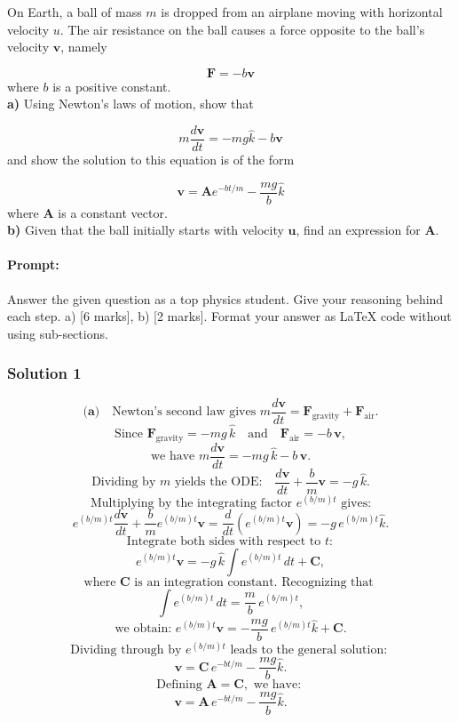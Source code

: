 \documentclass{article}
\begin{document}
On Earth, a ball of mass $m$ is dropped from an airplane moving with horizontal velocity $u$. The air resistance on the ball causes a force opposite to the ball's velocity $\mathbf{v}$, namely

\[
\mathbf{F} = -b \mathbf{v}
\]
where $b$ is a positive constant. \\

\textbf{a)} Using Newton's laws of motion, show that

\[
m \frac{d \mathbf{v}}{dt} = -mg \hat{k} - b \mathbf{v}
\]
and show the solution to this equation is of the form

\[
\mathbf{v} = \mathbf{A} e^{-bt/m} - \frac{mg}{b} \hat{k}
\]
where $\mathbf{A}$ is a constant vector.\\

\textbf{b)} Given that the ball initially starts with velocity $\mathbf{u}$, find an expression for $\mathbf{A}$.

\paragraph{Prompt: \\} 
Answer the given question as a top physics student. Give your reasoning behind each step. a) [6 marks], b) [2 marks].
Format your answer as LaTeX code without using sub-sections.

\subsubsection{Solution 1}
\[
\textbf{(a)}\quad \text{Newton's second law gives } m\frac{d\mathbf{v}}{dt} = \mathbf{F}_{\text{gravity}} + \mathbf{F}_{\text{air}}.
\]
\[
\text{Since } \mathbf{F}_{\text{gravity}} = -mg\,\hat{k} \quad \text{and} \quad \mathbf{F}_{\text{air}} = -b\,\mathbf{v},
\]
\[
\text{we have } m\frac{d\mathbf{v}}{dt} = -mg\,\hat{k} - b\,\mathbf{v}.
\]
\[
\text{Dividing by } m \text{ yields the ODE:} \quad \frac{d\mathbf{v}}{dt} + \frac{b}{m}\mathbf{v} = -g\,\hat{k}.
\]
\[
\text{Multiplying by the integrating factor } e^{(b/m)t} \text{ gives:}
\]
\[
e^{(b/m)t}\frac{d\mathbf{v}}{dt} + \frac{b}{m}e^{(b/m)t}\mathbf{v} = \frac{d}{dt}\left(e^{(b/m)t}\mathbf{v}\right) = -g\,e^{(b/m)t}\hat{k}.
\]
\[
\text{Integrate both sides with respect to } t:
\]
\[
e^{(b/m)t}\mathbf{v} = -g\,\hat{k}\int e^{(b/m)t}\,dt + \mathbf{C},
\]
\[
\text{where } \mathbf{C} \text{ is an integration constant. Recognizing that }
\]
\[
\int e^{(b/m)t}\,dt = \frac{m}{b}\,e^{(b/m)t},
\]
\[
\text{we obtain: } e^{(b/m)t}\mathbf{v} = -\frac{mg}{b}\,e^{(b/m)t}\hat{k} + \mathbf{C}.
\]
\[
\text{Dividing through by } e^{(b/m)t} \text{ leads to the general solution: }
\]
\[
\mathbf{v} = \mathbf{C}\,e^{-bt/m} - \frac{mg}{b}\hat{k}.
\]
\[
\text{Defining } \mathbf{A} = \mathbf{C}, \text{ we have: }
\]
\[
\mathbf{v} = \mathbf{A}\,e^{-bt/m} - \frac{mg}{b}\hat{k}.
\]
\end{document}
